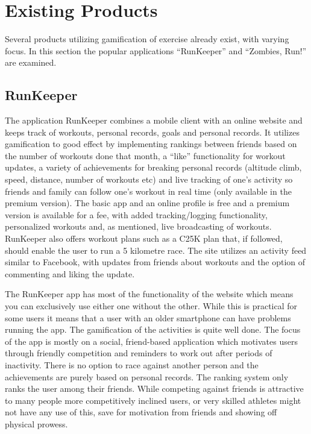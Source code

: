 \section{Existing Products}
Several products utilizing gamification of exercise already exist, with varying focus. In this section the popular applications ``RunKeeper'' and ``Zombies, Run!'' are examined. 

\subsection{RunKeeper}
The application RunKeeper combines a mobile client with an online website and keeps track of workouts, personal records, goals and personal records. It utilizes gamification to good effect by implementing rankings between friends based on the number of workouts done that month, a ``like'' functionality for workout updates, a variety of achievements for breaking personal records (altitude climb, speed, distance, number of workouts etc) and live tracking of one's activity so friends and family can follow one's workout in real time (only available in the premium version). The basic app and an online profile is free and a premium version is available for a fee, with added tracking/logging functionality, personalized workouts and, as mentioned, live broadcasting of workouts. RunKeeper also offers workout plans such as a \ac{C25K} plan that, if followed, should enable the user to run a 5 kilometre race. The site utilizes an activity feed similar to Facebook, with updates from friends about workouts and the option of commenting and liking the update. 

The RunKeeper app has most of the functionality of the website which means you can exclusively use either one without the other. While this is practical for some users it means that a user with an older smartphone can have problems running the app. The gamification of the activities is quite well done. The focus of the app is mostly on a social, friend-based application which motivates users through friendly competition and reminders to work out after periods of inactivity. There is no option to race against another person and the achievements are purely based on personal records. The ranking system only ranks the user among their friends. While competing against friends is attractive to many people more competitively inclined users, or very skilled athletes might not have any use of this, save for motivation from friends and showing off physical prowess.

